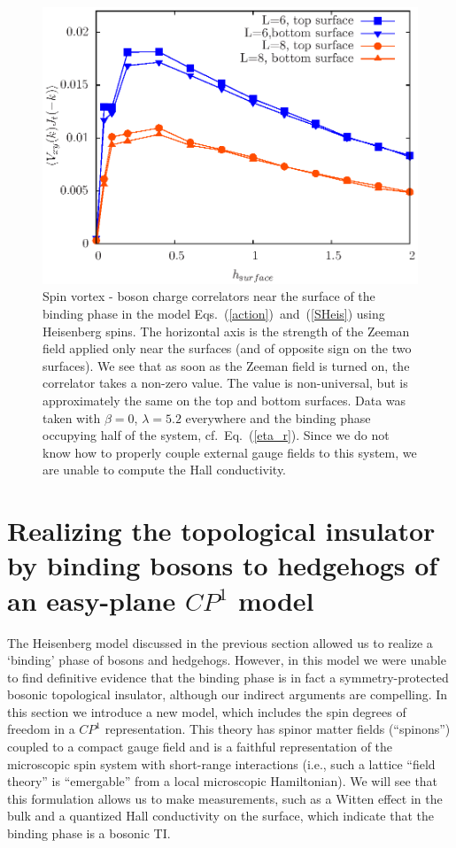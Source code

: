 \documentclass[prb,twocolumn]{revtex4-1}
\newcommand{\cp}{$CP^1$ }
\begin{document}
\begin{figure}
\includegraphics[width=\linewidth]{figures/vortexcor.eps}
\caption{Spin vortex - boson charge correlators near the surface of the binding phase in the model Eqs.~(\ref{action})~and~(\ref{SHeis}) using Heisenberg spins. The horizontal axis is the strength of the Zeeman field applied only near the surfaces (and of opposite sign on the two surfaces). We see that as soon as the Zeeman field is turned on, the correlator takes a non-zero value. The value is non-universal, but is approximately the same on the top and bottom surfaces. Data was taken with $\beta=0$, $\lambda=5.2$ everywhere and the binding phase occupying half of the system, cf.\ Eq.~(\ref{eta_r}).  Since we do not know how to properly couple external gauge fields to this system, we are unable to compute the Hall conductivity.
}
\label{heishall}
\end{figure}




\section{Realizing the topological insulator by binding bosons to hedgehogs of an easy-plane \cp model}
\label{section::CP1}

The Heisenberg model discussed in the previous section allowed us to realize a `binding' phase of bosons and hedgehogs. However, in this model we were unable to find definitive evidence that the binding phase is in fact a symmetry-protected bosonic topological insulator, although our indirect arguments are compelling. In this section we introduce a new model, which includes the spin degrees of freedom in a \cp representation. 
This theory has spinor matter fields (``spinons'') coupled to a compact gauge field and is a faithful representation of the microscopic spin system with short-range interactions (i.e., such a lattice ``field theory'' is ``emergable'' from a local microscopic Hamiltonian). We will see that this formulation allows us to make measurements, such as a Witten effect in the bulk and a quantized Hall conductivity on the surface, which indicate that the binding phase is a bosonic TI.
\end{document}
